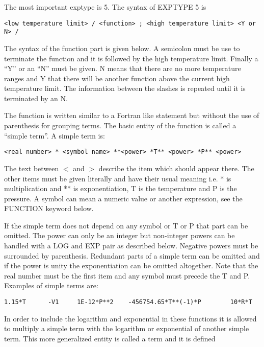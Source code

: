 \documentclass[12pt]{article}
\begin{document}
The most important exptype is 5. The syntax of EXPTYPE 5 is

\begin{verbatim}
<low temperature limit> / <function> ; <high temperature limit> <Y or N> /
\end{verbatim}

The syntax of the function part is given below. A semicolon must be
use to terminate the function and it is followed by the high
temperature limit. Finally a ``Y'' or an ``N'' must be given. N means that
there are no more temperature ranges and Y that there will be another
function above the current high temperature limit. The information
between the slashes is repeated until it is terminated by an N. 

The function is written similar to a Fortran like statement but
without the use of parenthesis for grouping terms. The basic entity of
the function is called a ``simple term''. A simple term is:

\begin{verbatim}
<real number> * <symbol name> **<power> *T** <power> *P** <power>
\end{verbatim}

The text between $<$ and $>$ describe the item which should appear
there. The other items must be given literally and have their usual
meaning i.e.  * is multiplication and ** is exponentiation, T is the
temperature and P is the pressure. A symbol can mean a numeric value
or another expression, see the FUNCTION keyword below.

If the simple term does not depend on any symbol or T or P that part
can be omitted. The power can only be an integer but non-integer powers
can be handled with a LOG and EXP pair as described below. Negative
powers must be surrounded by parenthesis. Redundant parts of a simple
term can be omitted and if the power is unity the exponentiation can
be omitted altogether. Note that the real number must be the first
item and any symbol must precede the T and P. Examples of simple terms
are:

\begin{verbatim}
1.15*T      -V1     1E-12*P**2    -456754.65*T**(-1)*P        10*R*T
\end{verbatim}

In order to include the logarithm and exponential in these functions
it is allowed to multiply a simple term with the logarithm or       
exponential of another simple term. This more generalized entity is 
called a term and it is defined
\end{document}
